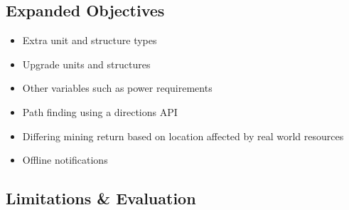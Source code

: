 \subsection{Expanded Objectives}
\begin{itemize}
\item Extra unit and structure types
\item Upgrade units and structures
\item Other variables such as power requirements
\item Path finding using a directions API
\item Differing mining return based on location affected by real world resources
\item Offline notifications
\end{itemize}


\subsection{Limitations \& Evaluation}

